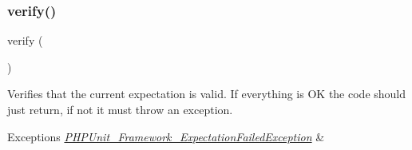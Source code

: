 \subsubsection{\texorpdfstring{verify()}{verify()}}
{\footnotesize\ttfamily verify (\begin{DoxyParamCaption}{ }\end{DoxyParamCaption})}

Verifies that the current expectation is valid. If everything is OK the code should just return, if not it must throw an exception.


\begin{DoxyExceptions}{Exceptions}
{\em \mbox{\hyperlink{class_p_h_p_unit___framework___expectation_failed_exception}{P\+H\+P\+Unit\+\_\+\+Framework\+\_\+\+Expectation\+Failed\+Exception}}} & \\
\hline
\end{DoxyExceptions}


